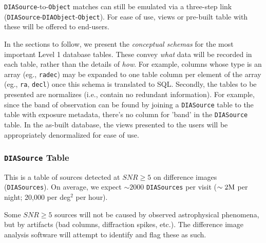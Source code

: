 \documentclass[12pt]{article}
\newcommand{\code}[1]{\texttt{#1}}
\newcommand{\DIASource}{\code{DIASource}\xspace}
\newcommand{\DIASources}{\code{DIASources}\xspace}
\newcommand{\DIAObject}{\code{DIAObject}\xspace}
\newcommand{\DIAObjects}{\code{DIAObjects}\xspace}
\newcommand{\DB}{{Level 1 database}\xspace}
\newcommand{\Object}{\code{Object}\xspace}
\newcommand{\SSObject}{\code{SSObject}\xspace}
\begin{document}
\vspace{1ex}

\DIASource-to-\Object matches can still be emulated via a three-step link
(\DIASource-\DIAObject-\Object). For ease of use, views or pre-built table
with these will be offered to end-users.


\vspace{2em}

In the sections to follow, we present the {\em conceptual schemas} for the
most important \DB tables. These convey {\em what} data will be recorded in
each table, rather than the details of {\em how}. For example, columns whose
type is an array (eg., \texttt{radec}) may be expanded to one table column per
element of the array (eg., \texttt{ra}, \texttt{decl}) once this schema is
translated to SQL. Secondly, the tables to be presented are normalizes (i.e.,
contain no redundant information). For example, since the band of observation
can be found by joining a \DIASource table to the table with exposure
metadata, there's no column for 'band' in the \DIASource table. In the
as-built database, the views presented to the users will be appropriately
denormalized for ease of use.

\subsubsection{\DIASource Table}

This is a table of sources detected at $SNR \geq 5$ on difference images
(\DIASources). On average, we expect $\sim 2000$ \DIASources per visit ($\sim
2{\rm M}$ per night; 20,000 per deg$^2$ per hour).

Some $SNR \geq 5$ sources will not be caused by observed astrophysical
phenomena, but by artifacts (bad columns, diffraction spikes, etc.). The
difference image analysis software will attempt to identify and flag these as
such.
\end{document}
